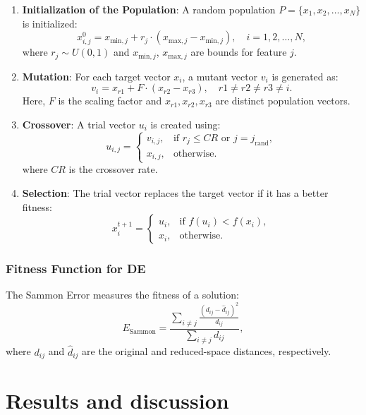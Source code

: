 \documentclass{styles/svproc}
\begin{document}
\begin{enumerate}
    \item \textbf{Initialization of the Population}: 
    A random population \( P = \{x_1, x_2, \dots, x_N\} \) is initialized:
    \[
    x_{i,j}^0 = x_{\text{min},j} + r_j \cdot (x_{\text{max},j} - x_{\text{min},j}), \quad i = 1, 2, \dots, N,
    \]
    where \( r_j \sim U(0, 1) \) and \( x_{\text{min},j} \), \( x_{\text{max},j} \) are bounds for feature \( j \).

    \item \textbf{Mutation}:
    For each target vector \( x_i \), a mutant vector \( v_i \) is generated as:
    \[
    v_i = x_{r1} + F \cdot (x_{r2} - x_{r3}), \quad r1 \neq r2 \neq r3 \neq i.
    \]
    Here, \( F \) is the scaling factor and \( x_{r1}, x_{r2}, x_{r3} \) are distinct population vectors.

    \item \textbf{Crossover}:
    A trial vector \( u_i \) is created using:
    \[
    u_{i,j} =
    \begin{cases}
    v_{i,j}, & \text{if } r_j \leq CR \text{ or } j = j_{\text{rand}}, \\
    x_{i,j}, & \text{otherwise}.
    \end{cases}
    \]
    where \( CR \) is the crossover rate.

    \item \textbf{Selection}:
    The trial vector replaces the target vector if it has a better fitness:
    \[
    x_i^{t+1} =
    \begin{cases}
    u_i, & \text{if } f(u_i) < f(x_i), \\
    x_i, & \text{otherwise}.
    \end{cases}
    \]
\end{enumerate}

\subsubsection{Fitness Function for DE}\label{fitness-function-de}

The Sammon Error measures the fitness of a solution:
\[
E_{\text{Sammon}} = \frac{\sum_{i \neq j} \frac{\left( d_{ij} - \hat{d}_{ij} \right)^2}{d_{ij}}}{\sum_{i \neq j} d_{ij}},
\]
where \( d_{ij} \) and \( \hat{d}_{ij} \) are the original and reduced-space distances, respectively.


\section{Results and discussion}
\label{S:Results}
\end{document}
